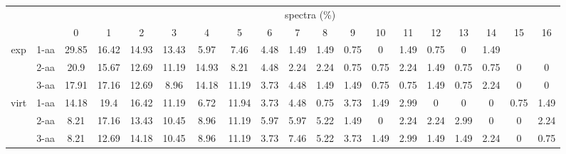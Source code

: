 \documentclass{article}[12pt]
\begin{document}
\begin{landscape}
\begin{table}[h]\tiny
\vspace{3mm}
{\centering
\begin{center}
\begin{tabular}{|c|l|c|c|c|c|c|c|c|c|c|c|c|c|c|c|c|c|c|}
  \hline
  \multicolumn{2}{|c|}{ } & \multicolumn{ 17 }{|c|}{ spectra (\%)} \\
  \cline{3- 19}
  \multicolumn{2}{|c|}{ }  & 0 & 1 & 2 & 3 & 4 & 5 & 6 & 7 & 8 & 9 & 10 & 11 & 12 & 13 & 14 & 15 & 16\\
  \hline
  \multirow{3}{*}{exp}
&  1-aa  & 29.85 & 16.42 & 14.93 & 13.43 & 5.97 & 7.46 & 4.48 & 1.49 & 1.49 & 0.75 & 0 & 1.49 & 0.75 & 0 & 1.49 &  & \\
&  2-aa  & 20.9 & 15.67 & 12.69 & 11.19 & 14.93 & 8.21 & 4.48 & 2.24 & 2.24 & 0.75 & 0.75 & 2.24 & 1.49 & 0.75 & 0.75 & 0 & 0\\
&  3-aa  & 17.91 & 17.16 & 12.69 & 8.96 & 14.18 & 11.19 & 3.73 & 4.48 & 1.49 & 1.49 & 0.75 & 0.75 & 1.49 & 0.75 & 2.24 & 0 & 0\\
 \hline
  \multirow{3}{*}{virt} 
&  1-aa  & 14.18 & 19.4 & 16.42 & 11.19 & 6.72 & 11.94 & 3.73 & 4.48 & 0.75 & 3.73 & 1.49 & 2.99 & 0 & 0 & 0 & 0.75 & 1.49\\
&  2-aa  & 8.21 & 17.16 & 13.43 & 10.45 & 8.96 & 11.19 & 5.97 & 5.97 & 5.22 & 1.49 & 0 & 2.24 & 2.24 & 2.99 & 0 & 0 & 2.24\\
&  3-aa  & 8.21 & 12.69 & 14.18 & 10.45 & 8.96 & 11.19 & 3.73 & 7.46 & 5.22 & 3.73 & 1.49 & 2.99 & 1.49 & 1.49 & 2.24 & 0 & 0.75\\
 \hline
\end{tabular}
\end{center}
\par}
\centering
\vspace{3mm}
\end{table}


\end{landscape}
\end{document}
